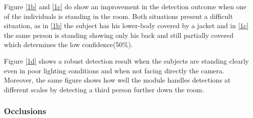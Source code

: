 Figure \ref{1b} and \ref{1c} do show an improvement in the detection outcome when one of the individuals is standing in the room. Both situations present a difficult situation, as in \ref{1b} the subject has his lower-body covered by a jacket and in \ref{1c} the same person is standing showing only his back and still partially covered which determines the low confidence(50\%).

Figure \ref{1d} shows a robust detection result when the subjects are standing clearly even in poor lighting conditions and when not facing directly the camera. Moreover, the same figure shows how well the module handles detections at different scales by detecting a third person further down the room.

\subsubsection{Occlusions}

